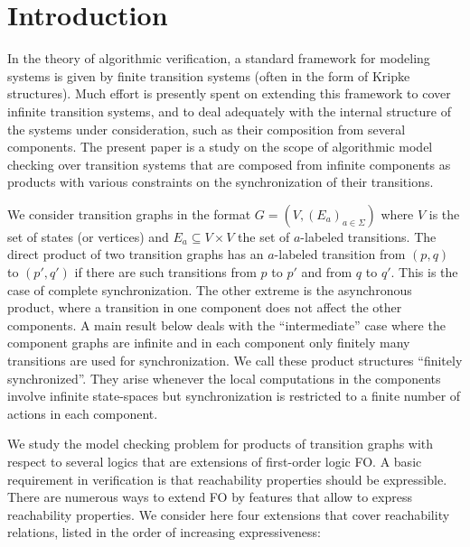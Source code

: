 \documentclass{LMCS}
\begin{document}
\section{Introduction}

In the theory of algorithmic verification, a standard framework for 
modeling systems is given by finite transition systems (often in the form 
of Kripke structures). Much effort is presently spent on extending this framework 
to cover infinite transition systems, and to deal adequately with the 
internal structure of the systems under consideration, such as their 
composition from several components. The present paper is a study on 
the scope of algorithmic model checking over transition systems that 
are composed from infinite 
components as products with various constraints on the synchronization of 
their transitions. 
 





We consider transition graphs in the format $G=(V,(E_a)_{a \in \Sigma})$
where $V$ is the set of states (or vertices) and $E_a \subseteq V \times V$ 
the set of $a$-labeled transitions. The direct product of two transition graphs has an $a$-labeled transition from 
$(p,q)$ to $(p', q')$ if there are such transitions from $p$ to $p'$ 
and from $q$ to $q'$. This is the case of complete synchronization. 
The other extreme is the asynchronous product, where a transition in one 
component does not affect the other components. A main result below deals 
with the ``intermediate'' case where the component graphs are infinite and 
in each component 
only finitely many transitions are used for synchronization. We call these product
structures ``finitely synchronized''. They arise whenever the local 
computations in the components involve infinite state-spaces but 
synchronization is restricted to a finite number of actions in each 
 component. 

We study the model checking problem for products of transition graphs 
with respect to several logics that are extensions of first-order logic FO.  
A basic requirement in verification is that reachability properties
should be expressible. There are numerous ways to extend FO by features
that allow to express reachability properties. We consider here four 
extensions that cover reachability relations, listed in the order 
of increasing expressiveness:
\end{document}
